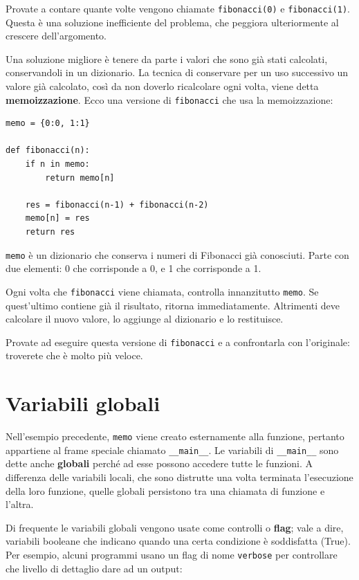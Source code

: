 \documentclass[10pt]{book}
\begin{document}
Provate a contare quante volte vengono chiamate {\tt fibonacci(0)} e {\tt fibonacci(1)}. Questa è una soluzione inefficiente del problema, che peggiora ulteriormente al crescere dell'argomento.

Una soluzione migliore è tenere da parte i valori che sono già stati calcolati, conservandoli in un dizionario. La tecnica di conservare per un uso successivo un valore già calcolato, così da non doverlo ricalcolare ogni volta, viene detta {\bf memoizzazione}.  Ecco una versione di {\tt fibonacci} che usa la memoizzazione:

\begin{verbatim}
memo = {0:0, 1:1}

def fibonacci(n):
    if n in memo:
        return memo[n]

    res = fibonacci(n-1) + fibonacci(n-2)
    memo[n] = res
    return res
\end{verbatim}
%
{\tt memo} è un dizionario che conserva i numeri di Fibonacci già conosciuti. Parte con due elementi: 0 che corrisponde a 0, e 1 che corrisponde a 1.

Ogni volta che {\tt fibonacci} viene chiamata, controlla innanzitutto {\tt memo}.
Se quest'ultimo contiene già il risultato, ritorna immediatamente. Altrimenti deve calcolare il nuovo valore, lo aggiunge al dizionario e lo restituisce.

Provate ad eseguire questa versione di {\tt fibonacci} e a confrontarla con l'originale: troverete che è molto più veloce.



\section{Variabili globali}

Nell'esempio precedente, {\tt memo} viene creato esternamente alla funzione, pertanto appartiene al frame speciale chiamato \verb"__main__".
Le variabili di \verb"__main__" sono dette anche {\bf globali}
perché ad esse possono accedere tutte le funzioni. A differenza delle variabili locali, che sono distrutte una volta terminata l'esecuzione della loro funzione, quelle globali persistono tra una chiamata di funzione e l'altra.

Di frequente le variabili globali vengono usate come controlli o {\bf flag}; vale a dire, variabili booleane che indicano quando una certa condizione è soddisfatta (True). Per esempio, alcuni programmi usano un flag di nome {\tt verbose} per controllare che livello di dettaglio dare ad un output:
\end{document}
